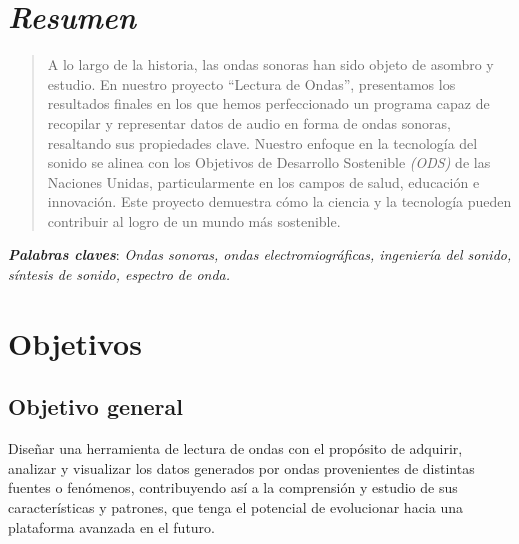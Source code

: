\documentclass[letterpaper, 12pt]{article}
\newcommand{\bolditalic}[1]{\textbf{\textit{#1}}}
\begin{document}
\nocite{source_code}
\nocite{vid_1}

\section*{\textit{Resumen}}

\begin{quote}
	A lo largo de la historia, las ondas sonoras han sido objeto de
	asombro y estudio. En nuestro proyecto ``Lectura de Ondas'',
	presentamos los resultados finales en los que hemos perfeccionado
	un programa capaz de recopilar y representar datos de audio en forma
	de ondas sonoras, resaltando sus propiedades clave. Nuestro enfoque
	en la tecnología del sonido se alinea con los Objetivos de Desarrollo
	Sostenible \textit{(ODS)} de las Naciones Unidas, particularmente en los campos
	de salud, educación e innovación. Este proyecto demuestra cómo la ciencia
	y la tecnología pueden contribuir al logro de un mundo más sostenible.
\end{quote}


\noindent\makebox[\linewidth]{\rule{\linewidth}{0.4pt}}

\bolditalic{Palabras claves}: \textit{Ondas sonoras, ondas electromiográficas,
	ingeniería del sonido, síntesis de sonido, espectro de
	onda.}

\noindent\makebox[\linewidth]{\rule{\linewidth}{0.4pt}}

\section*{Objetivos}

\subsection*{Objetivo general}

Diseñar una herramienta de lectura de ondas con el
propósito de adquirir, analizar y visualizar los datos
generados por ondas provenientes de distintas fuentes o
fenómenos, contribuyendo así a la comprensión y estudio de
sus características y patrones, que tenga el potencial de
evolucionar hacia una plataforma avanzada en el futuro.
\end{document}
